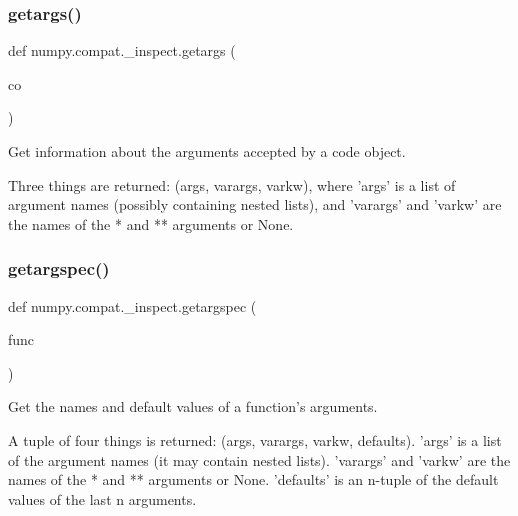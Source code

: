 \subsubsection{\texorpdfstring{getargs()}{getargs()}}
{\footnotesize\ttfamily def numpy.\+compat.\+\_\+inspect.\+getargs (\begin{DoxyParamCaption}\item[{}]{co }\end{DoxyParamCaption})}

\begin{DoxyVerb}Get information about the arguments accepted by a code object.

Three things are returned: (args, varargs, varkw), where 'args' is
a list of argument names (possibly containing nested lists), and
'varargs' and 'varkw' are the names of the * and ** arguments or None.\end{DoxyVerb}
 \mbox{\label{namespacenumpy_1_1compat_1_1__inspect_a15898a9bd81ac934993fdb5799f07f0b}} 
\subsubsection{\texorpdfstring{getargspec()}{getargspec()}}
{\footnotesize\ttfamily def numpy.\+compat.\+\_\+inspect.\+getargspec (\begin{DoxyParamCaption}\item[{}]{func }\end{DoxyParamCaption})}

\begin{DoxyVerb}Get the names and default values of a function's arguments.

A tuple of four things is returned: (args, varargs, varkw, defaults).
'args' is a list of the argument names (it may contain nested lists).
'varargs' and 'varkw' are the names of the * and ** arguments or None.
'defaults' is an n-tuple of the default values of the last n arguments.\end{DoxyVerb}
 \mbox{\label{namespacenumpy_1_1compat_1_1__inspect_a9a4cbd507be7b8c8d5f12d4d21a9defb}} 
